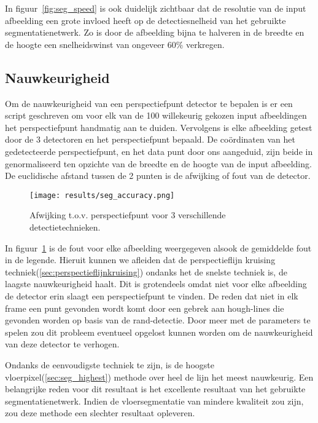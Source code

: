In figuur~\ref{fig:seg_speed} is ook duidelijk zichtbaar dat de resolutie van de input afbeelding een grote invloed heeft op de detectiesnelheid
van het gebruikte segmentatienetwerk.
Zo is door de afbeelding bijna te halveren in de breedte en de hoogte een snelheidswinst van ongeveer $60\%$ verkregen.


\subsection{Nauwkeurigheid}
Om de nauwkeurigheid van een perspectiefpunt detector te bepalen is er een script geschreven om voor elk van de 100 willekeurig gekozen input afbeeldingen
het perspectiefpunt handmatig aan te duiden.
Vervolgens is elke afbeelding getest door de 3 detectoren en het perspectiefpunt bepaald.
De co\"{o}rdinaten van het gedetecteerde perspectiefpunt, en het data punt door ons aangeduid, zijn beide in genormaliseerd ten opzichte van de breedte en de hoogte van de input afbeelding.
De euclidische afstand tussen de 2 punten is de afwijking of fout van de detector.

\begin{figure}[h]
    \centering
    \texttt{[image: results/seg\_accuracy.png]}
    \caption{Afwijking t.o.v. perspectiefpunt voor 3 verschillende detectietechnieken.}
    \label{fig:seg_accuracy}
\end{figure}

In figuur~\ref{fig:seg_accuracy} is de fout voor elke afbeelding weergegeven alsook de gemiddelde fout in de legende.
Hieruit kunnen we afleiden dat de perspectieflijn kruising techniek(\ref{sec:perspectieflijnkruising}) ondanks het de snelste techniek is, de laagste nauwkeurigheid haalt.
Dit is grotendeels omdat niet voor elke afbeelding de detector erin slaagt een perspectiefpunt te vinden. De reden dat niet in elk frame
een punt gevonden wordt komt door een gebrek aan hough-lines die gevonden worden op basis van de rand-detectie.
Door meer met de parameters te spelen zou dit probleem eventueel opgelost kunnen worden om de nauwkeurigheid van deze detector te verhogen.

Ondanks de eenvoudigste techniek te zijn, is de hoogste vloerpixel(\ref{sec:seg_highest}) methode over heel de lijn het meest nauwkeurig.
Een belangrijke reden voor dit resultaat is het excellente resultaat van het gebruikte segmentatienetwerk.
Indien de vloersegmentatie van mindere kwaliteit zou zijn, zou deze methode een slechter resultaat opleveren.

